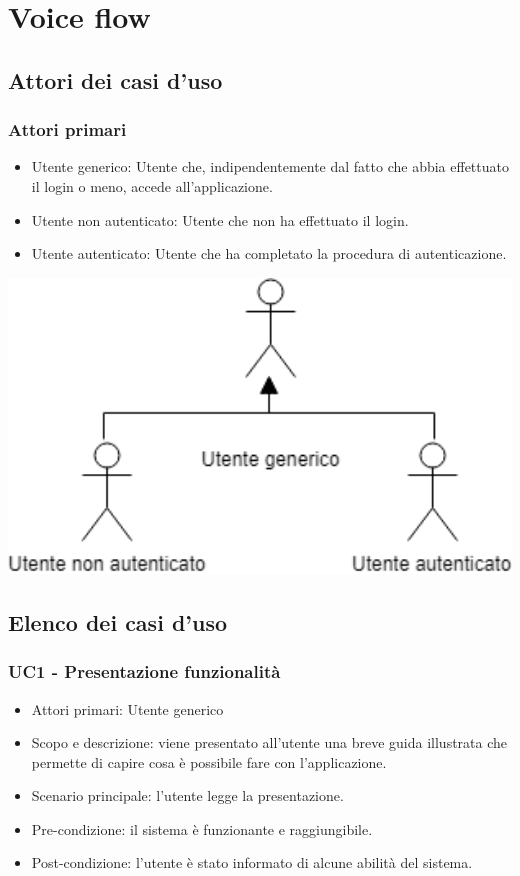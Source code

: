 \clearpage
\section{Voice flow}
\subsection{Attori dei casi d'uso}
\subsubsection{Attori primari}
\begin{itemize}
	\item  Utente generico: Utente che, indipendentemente dal fatto che abbia effettuato il login o meno, accede all'applicazione.
	\item  Utente non autenticato: Utente che non ha effettuato il login.
	\item  Utente autenticato: Utente che ha completato la procedura di autenticazione.
\end{itemize}
\includegraphics[width=1\textwidth]{../includes/pics/primari.png}
\subsection{Elenco dei casi d'uso}
\subsubsection{UC1 - Presentazione funzionalità}
\begin{itemize}
	\item  Attori primari:  Utente generico
	\item  Scopo e descrizione: viene presentato all'utente una breve guida illustrata che permette di capire cosa è possibile fare con l'applicazione.
	\item  Scenario principale: l'utente legge la presentazione.
	\item  Pre-condizione: il sistema è funzionante e raggiungibile.
	\item  Post-condizione: l'utente è stato informato di alcune abilità del sistema.
\end{itemize}